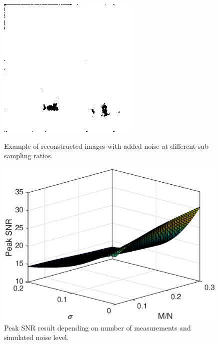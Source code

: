 \begin{figure}[H]
\begin{minipage}[t]{0.245\textwidth}
    \label{fig:noise_30_6}
    \includegraphics[width = \textwidth]{result/noisy/1_30_0.png}
    \label{fig:noise_30_0}
\end{minipage}
	\caption{Example of reconstructed images with added noise at different sub sampling ratios.}
	\label{fig:noisy}
\end{figure}

\begin{figure}[H]
    \centering
    \includegraphics[width = 0.7\linewidth]{result/synt_sss/PSNR_fit.eps}
    \caption{Peak SNR result depending on number of measurements and simulated noise level.}
    \label{fig:psnr_3d}
\end{figure}

